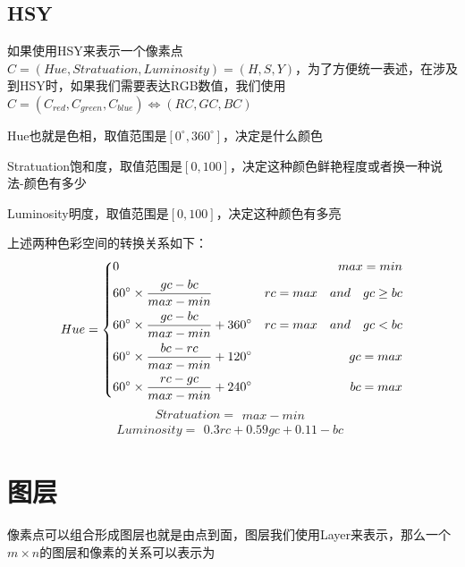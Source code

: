 \subsection{ HSY}
如果使用HSY来表示一个像素点$C=(Hue,Stratuation,Luminosity)=(H,S,Y)$，为了方便统一表述，在涉及到HSY时，如果我们需要表达RGB数值，我们使用$C=(C_{red},C_{green},C_{blue})\iff(RC,GC,BC)$
\begin{notice}
	\item Hue也就是色相，取值范围是$[0^{\circ},360^{\circ}]$，决定是什么颜色
	\item Stratuation饱和度，取值范围是$[0,100]$，决定这种颜色鲜艳程度或者换一种说法-颜色有多少
	\item Luminosity明度，取值范围是$[0,100]$，决定这种颜色有多亮
\end{notice}
上述两种色彩空间的转换关系如下：
\begin{equation}
	Hue = \left\{ \begin{aligned}&0& \space  max = min \\&60^{\circ}\times \dfrac{gc-bc}{max-min} &  \space rc=max\quad and \quad gc \geq bc\\&60^{\circ}\times \dfrac{gc-bc}{max-min} +360^{\circ}&  \space rc=max\quad and \quad gc<bc\\&60^{\circ}\times \dfrac{bc-rc}{max-min} +120^{\circ}&  \space gc=max\\&60^{\circ}\times \dfrac{rc-gc}{max-min} +240^{\circ}&   \space bc=max\\\end{aligned}\right. 
\end{equation} 
\begin{equation}Stratuation = \begin{aligned}max-min\end{aligned}\end{equation} 
\begin{equation}Luminosity = \begin{aligned}0.3rc+0.59gc+0.11-bc\end{aligned} \end{equation} 

\section{图层}
\indent 像素点可以组合形成图层也就是由点到面，图层我们使用Layer来表示，那么一个$m\times n$的图层和像素的关系可以表示为
